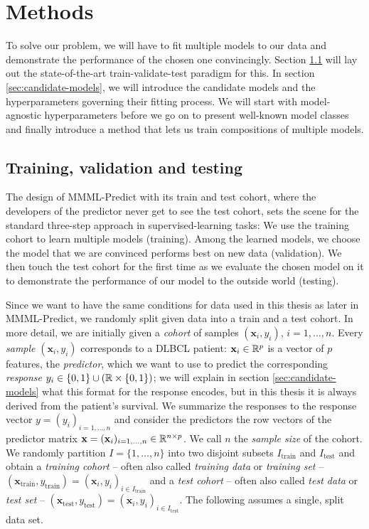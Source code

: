 \chapter{Methods} \label{chap:methods}

To solve our problem, we will have to fit multiple models to our data and demonstrate the 
performance of the chosen one convincingly. Section \ref{sec:train-val-test} will lay out the 
state-of-the-art train-validate-test paradigm for this. In section \ref{sec:candidate-models}, we 
will introduce the candidate models and the hyperparameters governing their fitting process. We will 
start with model-agnostic hyperparameters before we go on to present well-known model classes and 
finally introduce a method that lets us train compositions of multiple models.

\section{Training, validation and testing}\label{sec:train-val-test}

The design of MMML-Predict with its train and test cohort, where the developers of the predictor 
never get to see the test cohort, sets the scene for the standard three-step approach in 
supervised-learning tasks: We use the training cohort to learn multiple models (training). Among the 
learned models, we choose the model that we are convinced performs best on new data (validation). We 
then touch the test cohort for the first time as we evaluate the chosen model on it to demonstrate 
the performance of our model to the outside world (testing).

Since we want to have the same conditions for data used in this thesis as later in MMML-Predict,
we randomly split given data into a train and a test cohort. In more detail, we are initially given 
a \textit{cohort} of samples $(\mathbf{x}_i, y_i)$, $i = 1, \ldots, n$. Every \textit{sample}
$(\mathbf{x}_i, y_i)$ corresponds to a DLBCL patient: $\mathbf{x}_i \in \mathbb{R}^p$ is a vector of $p$ 
features, the \textit{predictor}, which we want to use to predict the corresponding \textit{response} 
$y_i \in \{0, 1\} \cup (\mathbb{R} \times \{0, 1\})$; we will explain in section \ref{sec:candidate-models} 
what this format for the response encodes, but in this thesis it is always derived from 
the patient's survival. We summarize the 
responses to the response vector $y = (y_i)_{i = 1, \ldots, n}$ and consider the predictors the row 
vectors of the predictor matrix $\mathbf{x} = (\mathbf{x}_i)_{i = 1, \ldots, n} \in \mathbb{R}^{n \times p}$. We 
call $n$ the \textit{sample size} of the cohort. We randomly partition $I = \{1, \ldots, n\}$ into two 
disjoint subsets $I_\text{train}$ and $I_\text{test}$ and obtain a \textit{training cohort} -- often 
also called \textit{training data} or \textit{training set} --
$(\mathbf{x}_\text{train}, y_\text{train}) = (\mathbf{x}_i, y_i)_{i \in I_\text{train}}$ and a \textit{test 
cohort} -- often also called \textit{test data} or \textit{test set} -- 
$(\mathbf{x}_\text{test}, y_\text{test}) = (\mathbf{x}_i, y_i)_{i \in I_\text{test}}$. The following assumes 
a single, split data set.

